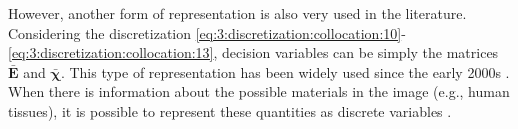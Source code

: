 			However, another form of representation is also very used in the literature. Considering the discretization \eqref{eq:3:discretization:collocation:10}-\eqref{eq:3:discretization:collocation:13}, decision variables can be simply the matrices $\mathbf{\bar{E}}$ and $\boldsymbol{\bar{\chi}}$. This type of representation has been widely used since the early 2000s \citep{donelli2005computational,donelli2006integrated,caorsi2000two,salucci2017multifrequency,yang2021fft,etminan2018electromagnetic}. When there is information about the possible materials in the image (e.g., human tissues), it is possible to represent these quantities as discrete variables \citep{modiri2012novel}.
			
